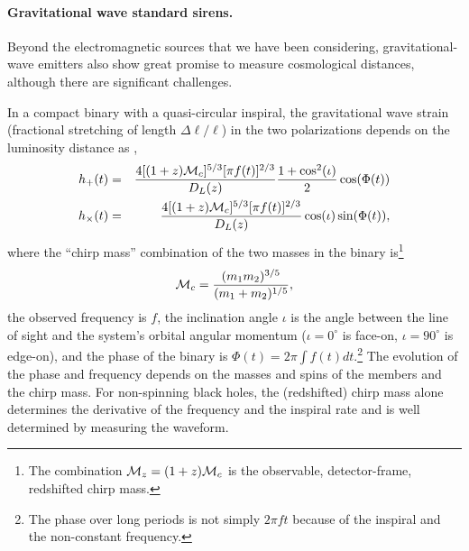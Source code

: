


\paragraph{Gravitational wave standard sirens.} Beyond the electromagnetic sources that we have been considering, gravitational-wave emitters also show great promise to measure cosmological distances, although there are significant challenges.

In a compact binary with a quasi-circular inspiral, the gravitational wave strain (fractional stretching of length $\Delta \ell/\ell$) in the two polarizations depends on the luminosity distance as \citep{2005ApJ...629...15H,2007gwte.book.....M},
\begin{eqnarray}
  h_+(t) &=& \frac{4[(1+z) {\cal M}_c ]^{5/3} [\pi f(t)]^{2/3}}{D_L(z)} \frac{ 1 + \cos^2(\iota) }{2} \cos(\Phi(t)) \\
  h_\times(t) &=& \frac{4[(1+z) {\cal M}_c ]^{5/3} [\pi f(t)]^{2/3}}{D_L(z)} \cos(\iota) \sin(\Phi(t)), \label{eqn:GW_distance_measure}
\end{eqnarray}
where the ``chirp mass'' combination of the two masses in the binary is\footnote{The combination $ {\cal M}_z = (1+z) {\cal M}_c$ is the observable, detector-frame, redshifted chirp mass.}
\begin{equation}
 {\cal M}_c = \frac{(m_1 m_2)^{3/5}}{(m_1 + m_2)^{1/5}},
\end{equation}
the observed frequency is $f$, the inclination angle $\iota$ is the angle between the line of sight and the system's orbital angular momentum ($\iota=0^\circ$ is face-on, $\iota = 90^\circ$ is edge-on), and the phase of the binary is $\Phi(t) = 2\pi  \int  f(t)  dt$.\footnote{The phase over long periods is not simply $2\pi ft$ because of the inspiral and the non-constant frequency.}
The evolution of the phase and frequency depends on the masses and spins of the members and the chirp mass.  For non-spinning black holes, the (redshifted) chirp mass alone determines the derivative of the frequency and the inspiral rate and is well determined by measuring the waveform.

